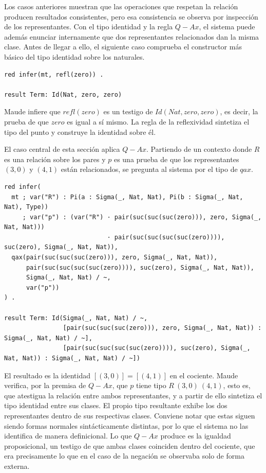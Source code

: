 Los casos anteriores muestran que las operaciones que respetan la relación producen resultados consistentes, pero esa consistencia se observa por inspección de los representantes. Con el tipo identidad y la regla $Q-Ax$, el sistema puede además enunciar internamente que dos representantes relacionados dan la misma clase. Antes de llegar a ello, el siguiente caso comprueba el constructor más básico del tipo identidad sobre los naturales.

\begin{lstlisting}
red infer(mt, refl(zero)) .

result Term: Id(Nat, zero, zero)
\end{lstlisting}

Maude infiere que $refl(zero)$ es un testigo de $Id(Nat, zero, zero)$, es decir, la prueba de que $zero$ es igual a sí mismo. La regla de la reflexividad sintetiza el tipo del punto y construye la identidad sobre él.

El caso central de esta sección aplica $Q-Ax$. Partiendo de un contexto donde $R$ es una relación sobre los pares y $p$ es una prueba de que los representantes $(3, 0)$ y $(4, 1)$ están relacionados, se pregunta al sistema por el tipo de $qax$.

\begin{lstlisting}
red infer(
  mt ; var("R") : Pi(a : Sigma(_, Nat, Nat), Pi(b : Sigma(_, Nat, Nat), Type))
     ; var("p") : (var("R") · pair(suc(suc(suc(zero))), zero, Sigma(_, Nat, Nat)))
                            · pair(suc(suc(suc(suc(zero)))), suc(zero), Sigma(_, Nat, Nat)),
  qax(pair(suc(suc(suc(zero))), zero, Sigma(_, Nat, Nat)),
      pair(suc(suc(suc(suc(zero)))), suc(zero), Sigma(_, Nat, Nat)),
      Sigma(_, Nat, Nat) / ~,
      var("p"))
) .

result Term: Id(Sigma(_, Nat, Nat) / ~,
                [pair(suc(suc(suc(zero))), zero, Sigma(_, Nat, Nat)) : Sigma(_, Nat, Nat) / ~],
                [pair(suc(suc(suc(suc(zero)))), suc(zero), Sigma(_, Nat, Nat)) : Sigma(_, Nat, Nat) / ~])
\end{lstlisting}

El resultado es la identidad $[(3, 0)] = [(4, 1)]$ en el cociente. Maude verifica, por la premisa de $Q-Ax$, que $p$ tiene tipo $R\ (3, 0)\ (4, 1)$, esto es, que atestigua la relación entre ambos representantes, y a partir de ello sintetiza el tipo identidad entre sus clases. El propio tipo resultante exhibe los dos representantes dentro de sus respectivas clases. Conviene notar que estas siguen siendo formas normales sintácticamente distintas, por lo que el sistema no las identifica de manera definicional. Lo que $Q-Ax$ produce es la igualdad proposicional, un testigo de que ambas clases coinciden dentro del cociente, que era precisamente lo que en el caso de la negación se observaba solo de forma externa.

